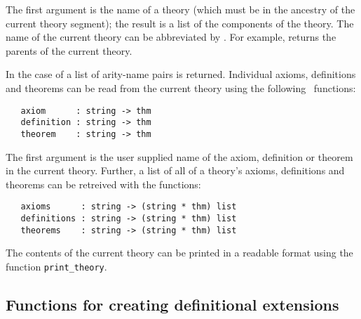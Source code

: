 \noindent The first argument is the name of a theory (which must be in the
ancestry of the current theory segment); the result is a list of the
components of the theory. The name of the current theory can be
abbreviated by . For
example,  returns the parents of the current theory.

In the case of  a list of arity-name pairs is returned.
Individual axioms, definitions and theorems can be read from the
current theory using the following \ML\ functions:

\begin{boxed}
\begin{verbatim}
   axiom      : string -> thm
   definition : string -> thm
   theorem    : string -> thm
\end{verbatim}\end{boxed}

\noindent The first argument is the user supplied name of the axiom,
definition or theorem in the current theory.  Further, a list of all
of a theory's axioms, definitions and theorems can be retreived with
the \ML{} functions:

\begin{boxed}
\begin{verbatim}
   axioms      : string -> (string * thm) list
   definitions : string -> (string * thm) list
   theorems    : string -> (string * thm) list
\end{verbatim}\end{boxed}

The contents of the current theory can be printed in a readable format using the function
{\small\verb+print_theory+}.

\subsection{Functions for creating definitional extensions}
\label{avra_definitional}

